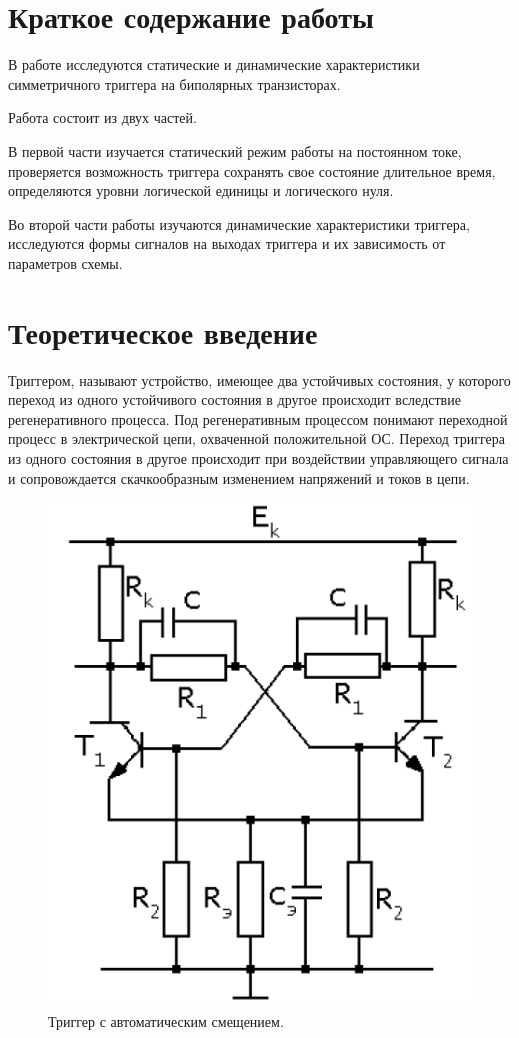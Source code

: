 \documentclass[a4paper,14pt]{article}
\begin{document}

\tableofcontents
\pagebreak
\section{Краткое содержание работы}

В работе исследуются статические и динамические характеристики симметричного триггера на биполярных транзисторах.

Работа состоит из двух частей.

В первой части изучается статический режим работы на постоянном токе,
проверяется возможность триггера сохранять свое состояние длительное время,
определяются уровни логической единицы и логического нуля.

Во второй части работы изучаются динамические характеристики триггера,
исследуются формы сигналов на выходах триггера и их зависимость от параметров схемы.

\section{Теоретическое введение}
Триггером, называют устройство, имеющее два устойчивых состояния, у которого
переход из одного устойчивого состояния в другое происходит вследствие регенеративного
процесса. Под регенеративным процессом понимают переходной процесс в электрической
цепи, охваченной положительной ОС. Переход триггера из одного состояния в другое
происходит при воздействии управляющего сигнала и сопровождается скачкообразным
изменением напряжений и токов в цепи.

\begin{figure}[H]
	\centering
	\includegraphics{image/screenshot001}
	\caption{Триггер с автоматическим смещением.}
	\label{fig:screenshot001}
\end{figure}
\end{document}
